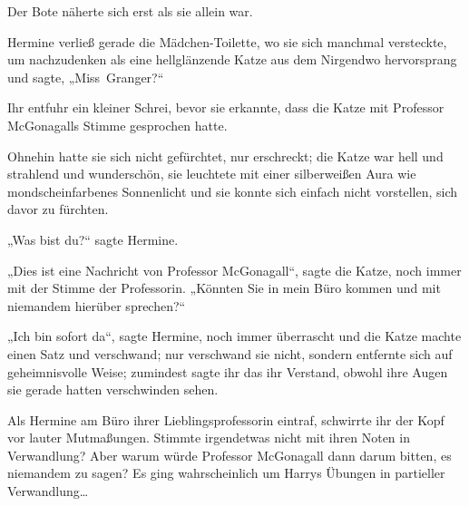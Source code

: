
Der Bote näherte sich erst als sie allein war.

Hermine verließ gerade die Mädchen-Toilette, wo sie sich manchmal versteckte, um nachzudenken als eine hellglänzende Katze aus dem Nirgendwo hervorsprang und sagte,
„Miss~Granger?“

Ihr entfuhr ein kleiner Schrei, bevor sie erkannte, dass die Katze mit Professor McGonagalls Stimme gesprochen hatte.

Ohnehin hatte sie sich nicht gefürchtet, nur erschreckt; die Katze war hell und strahlend und wunderschön, sie leuchtete mit einer silberweißen Aura wie mondscheinfarbenes Sonnenlicht und sie konnte sich einfach nicht vorstellen, sich davor zu fürchten.

„Was bist du?“ sagte Hermine.

„Dies ist eine Nachricht von Professor McGonagall“, sagte die Katze, noch immer mit der Stimme der Professorin.
„Könnten Sie in mein Büro kommen und mit niemandem hierüber sprechen?“

„Ich bin sofort da“, sagte Hermine, noch immer überrascht und die Katze machte einen Satz und verschwand; nur verschwand sie nicht, sondern entfernte sich auf geheimnisvolle Weise; zumindest sagte ihr das ihr Verstand, obwohl ihre Augen sie gerade hatten verschwinden sehen.

Als Hermine am Büro ihrer Lieblingsprofessorin eintraf, schwirrte ihr der Kopf vor lauter Mutmaßungen. Stimmte irgendetwas nicht mit ihren Noten in Verwandlung? Aber warum würde Professor McGonagall dann darum bitten, es niemandem zu sagen? Es ging wahrscheinlich um Harrys Übungen in partieller Verwandlung…

